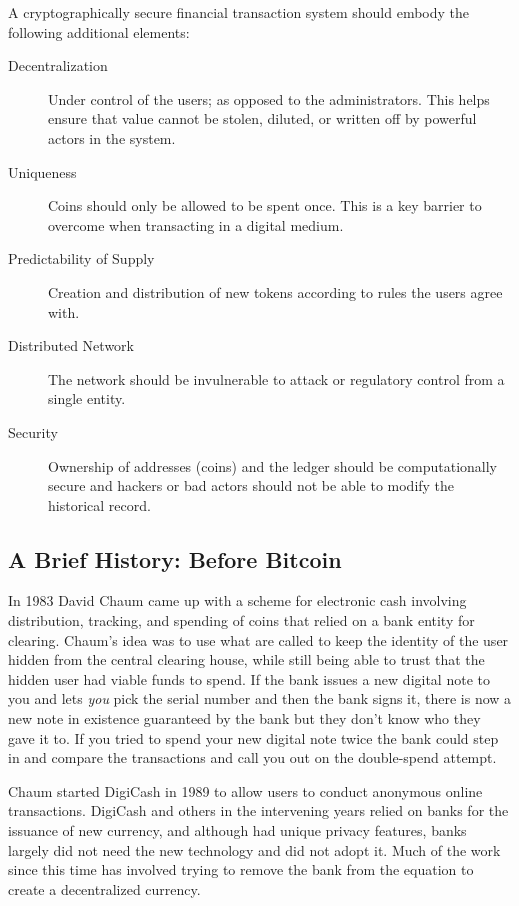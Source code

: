 A cryptographically secure financial transaction system should embody the following additional elements:
	\begin{description}	
	\item [Decentralization] Under control of the users; as opposed to the administrators. This helps ensure that value cannot be stolen, diluted, or written off by powerful actors in the system.
	\item [Uniqueness] Coins should only be allowed to be spent once. This is a key barrier to overcome when transacting in a digital medium.
	\item [Predictability of Supply] Creation and distribution of new tokens according to rules the users agree with. 
	\item [Distributed Network] The network should be invulnerable to attack or regulatory control from a single entity.
	\item [Security] Ownership of addresses (coins) and the ledger should be computationally secure and  hackers or bad actors should not be able to modify the historical record.
\end{description}

\subsection*{A Brief History: Before Bitcoin}
In 1983 David Chaum came up with a scheme for electronic cash involving distribution, tracking, and spending of coins that relied on a bank entity for clearing. Chaum's idea was to use what are called  to keep the identity of the user hidden from the central clearing house, while still being able to trust that the hidden user had viable funds to spend. If the bank issues a new digital note to you and lets \textit{you} pick the serial number and then the bank signs it, there is now a new note in existence guaranteed by the bank but they don't know who they gave it to. If you tried to spend your new digital note twice the bank could step in and compare the transactions and call you out on the double-spend attempt.

Chaum started DigiCash in 1989 to allow users to conduct anonymous online transactions. DigiCash and others in the intervening years relied on banks for the issuance of new currency, and although had unique privacy features, banks largely did not need the new technology and did not adopt it. Much of the work since this time has involved trying to remove the bank from the equation to create a decentralized currency.  

